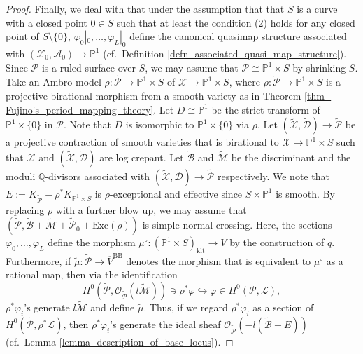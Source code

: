 \documentclass[10pt,a4paper]{amsart}
\begin{document}
\begin{proof}
Finally, we deal with that under the assumption that that $S$ is a curve with a closed point $0\in S$ such that at least the condition (2) holds for any closed point of $S\setminus\{0\}$, 
$\varphi_0|_0,\ldots,\varphi_L|_0$ define the canonical quasimap structure associated with $(\mathcal{X}_0,\mathcal{A}_0)\to \mathbb{P}^1$ (cf.~Definition \ref{defn--associated--quasi--map--structure}).
Since $\mathcal{P}$ is a ruled surface over $S$, we may assume that $\mathcal{P}\cong\mathbb{P}^1\times S$ by shrinking $S$. 
 Take an Ambro model $\rho\colon\widetilde{\mathcal{P}}\to \mathbb{P}^1\times S$ of $\mathcal{X}\to\mathbb{P}^1\times S$, where $\rho\colon\widetilde{\mathcal{P}}\to \mathbb{P}^1\times S$ is a projective birational morphism from a smooth variety as in Theorem \ref{thm--Fujino's--period--mapping--theory}.
    Let $D\cong\mathbb{P}^1$ be the strict transform of $\mathbb{P}^1\times\{0\}$ in $\mathcal{P}$. 
    Note that $D$ is isomorphic to $\mathbb{P}^1\times\{0\}$ via $\rho$.
    Let $(\widetilde{\mathcal{X}},\widetilde{\mathcal{D}})\to\widetilde{\mathcal{P}}$ be a projective contraction of smooth varieties that is birational to $\mathcal{X}\to \mathbb{P}^1\times S$ such that $\mathcal{X}$ and $(\widetilde{\mathcal{X}},\widetilde{\mathcal{D}})$ are log crepant.
    Let $\widetilde{\mathcal{B}}$ and $\widetilde{\mathcal{M}}$ be the discriminant and the moduli $\mathbb{Q}$-divisors associated with $(\widetilde{\mathcal{X}},\widetilde{\mathcal{D}})\to\widetilde{\mathcal{P}}$ respectively. 
    We note that $E:=K_{\widetilde{\mathcal{P}}}-\rho^*K_{\mathbb{P}^1\times S}$ is $\rho$-exceptional and effective since $S\times \mathbb{P}^1$ is smooth. 
    By replacing $\rho$ with a further blow up, we may assume that $(\widetilde{\mathcal{P}},\widetilde{\mathcal{B}}+\widetilde{\mathcal{M}}+\widetilde{\mathcal{P}}_0 + \mathrm{Exc}(\rho))$ is simple normal crossing.
    Here, the sections $\varphi_0,\ldots,\varphi_L$ define the morphism $\mu^\circ\colon (\mathbb{P}^1\times S)_{\mathrm{klt}}\to V$ by the construction of $q$.
    Furthermore, if $\tilde{\mu}\colon \widetilde{\mathcal{P}}\to \overline{V}^{\mathrm{BB}}$ denotes the morphism that is equivalent to $\mu^\circ$ as a rational map, then via the identification 
    \[ H^0(\tilde{\mathcal{P}},\mathcal{O}_{\widetilde{\mathcal{P}}}(l\widetilde{\mathcal{M}}))\ni\rho^*\varphi\hookrightarrow  \varphi\in H^0(\mathcal{P},\mathscr{L}),
    \]
    $\rho^*\varphi_i$'s generate $l\widetilde{\mathcal{M}}$ and define $\tilde{\mu}$.
    Thus, if we regard $\rho^*\varphi_i$ as a section of $H^0(\widetilde{\mathcal{P}},\rho^*\mathscr{L})$, then $\rho^*\varphi_i$'s generate the ideal sheaf $\mathcal{O}_{\widetilde{\mathcal{P}}}(-l(\widetilde{\mathcal{B}}+E))$ (cf.~Lemma \ref{lemma--description--of--base--locus}).

\end{proof}
\end{document}
